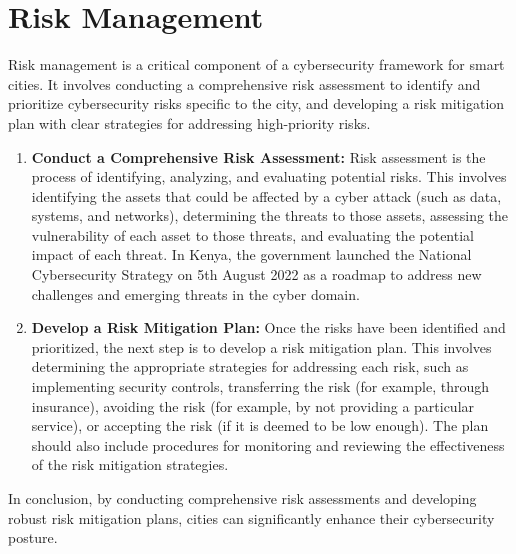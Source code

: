 \documentclass{article}
\begin{document}
\section{Risk Management}
Risk management is a critical component of a cybersecurity framework for smart cities. It involves conducting a comprehensive risk assessment to identify and prioritize cybersecurity risks specific to the city, and developing a risk mitigation plan with clear strategies for addressing high-priority risks\cite{nakar-2022}\cite{ibm-cyber-risk-management-no-date}\cite{securityscorecard-2023}.
\begin{enumerate}[label=\alph*)]
    \item \textbf{Conduct a Comprehensive Risk Assessment:} Risk assessment is the process of identifying, analyzing, and evaluating potential risks\cite{nakar-2022}\cite{ibm-cyber-risk-management-no-date}\cite{securityscorecard-2023}. This involves identifying the assets that could be affected by a cyber attack (such as data, systems, and networks), determining the threats to those assets, assessing the vulnerability of each asset to those threats, and evaluating the potential impact of each threat\cite{nakar-2022}\cite{ibm-cyber-risk-management-no-date}\cite{securityscorecard-2023}. In Kenya, the government launched the National Cybersecurity Strategy on 5th August 2022 as a roadmap to address new challenges and emerging threats in the cyber domain\cite{national-computer-and-cybercrimes-coordination-committee-no-date}.
    \item \textbf{Develop a Risk Mitigation Plan:}  Once the risks have been identified and prioritized, the next step is to develop a risk mitigation plan\cite{nakar-2022}\cite{ibm-cyber-risk-management-no-date}\cite{securityscorecard-2023}. This involves determining the appropriate strategies for addressing each risk, such as implementing security controls, transferring the risk (for example, through insurance), avoiding the risk (for example, by not providing a particular service), or accepting the risk (if it is deemed to be low enough)\cite{nakar-2022}\cite{ibm-cyber-risk-management-no-date}\cite{securityscorecard-2023}. The plan should also include procedures for monitoring and reviewing the effectiveness of the risk mitigation strategies\cite{nakar-2022}\cite{ibm-cyber-risk-management-no-date}\cite{securityscorecard-2023}.



\end{enumerate}
In conclusion, by conducting comprehensive risk assessments and developing robust risk mitigation plans, cities can significantly enhance their cybersecurity posture\cite{nakar-2022}\cite{ibm-cyber-risk-management-no-date}\cite{securityscorecard-2023}.
\end{document}
